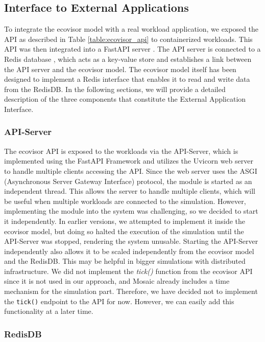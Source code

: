 \subsection{Interface to External Applications}

To integrate the ecovisor model with a real workload application, we exposed the
API as described in Table \ref{table:ecovisor_api} to containerized workloads.
This API was then integrated into a FastAPI server \cite{fastapi}. The API
server is connected to a Redis database \cite{redis}, which acts as a key-value
store and establishes a link between the API server and the ecovisor model. The
ecovisor model itself has been designed to implement a Redis interface that
enables it to read and write data from the RedisDB. In the following sections,
we will provide a detailed description of the three components that constitute
the External Application Interface.

\subsubsection{API-Server}

The ecovisor API is exposed to the workloads via the API-Server, which is
implemented using the FastAPI Framework and utilizes the Uvicorn web server
\cite{uvicorn} to handle multiple clients accessing the API. Since the web
server uses the ASGI (Asynchronous Server Gateway Interface) protocol, the
module is started as an independent thread. This allows the server to handle
multiple clients, which will be useful when multiple workloads are connected to
the simulation. However, implementing the module into the system was
challenging, so we decided to start it independently. In earlier versions, we
attempted to implement it inside the ecovisor model, but doing so halted the
execution of the simulation until the API-Server was stopped, rendering the
system unusable. Starting the API-Server independently also allows it to be
scaled independently from the ecovisor model and the RedisDB. This may be
helpful in bigger simulations with distributed infrastructure. We did not
implement the \textit{tick()} function from the ecovisor API since it is not
used in our approach, and Mosaic already includes a time mechanism for the
simulation part. Therefore, we have decided not to implement the \texttt{tick()}
endpoint to the API for now. However, we can easily add this functionality at a
later time.

\subsubsection{RedisDB}


